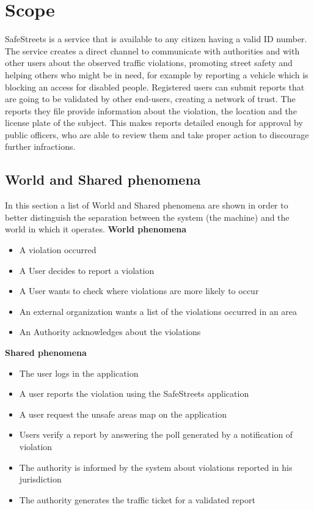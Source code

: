 \section{Scope}
SafeStreets is a service that is available to any citizen having a valid ID number.
The service creates a direct channel to communicate with authorities and with other users about the observed traffic violations, promoting street safety and
helping others who might be in need, for example by reporting a vehicle which is blocking an access for disabled people.
Registered users can submit reports that are going to be validated by other end-users, creating a network of trust.
The reports they file provide information about the violation, the location and the license plate of the subject. This makes reports detailed enough for
approval by public officers, who are able to review them and take proper action to discourage further infractions.

\subsection{World and Shared phenomena}
In this section a list of World and Shared phenomena are shown in order to better distinguish the separation between the system 
(the machine) and the world in which it operates. \newline
\indent \textbf{World phenomena}
\begin{itemize}
  \item A violation occurred
  \item A User decides to report a violation
  \item A User wants to check where violations are more likely to occur
  \item An external organization wants a list of the violations occurred in an area
  \item An Authority acknowledges about the violations
\end{itemize}

\textbf{Shared phenomena}
\begin{itemize}
  \item The user logs in the application
  \item A user reports the violation using the SafeStreets application
  \item A user request the unsafe areas map on the application
  \item Users verify a report by answering the poll generated by a notification of violation
  \item The authority is informed by the system about violations reported in his jurisdiction
  \item The authority generates the traffic ticket for a validated report
\end{itemize}

